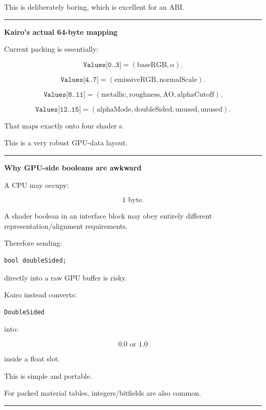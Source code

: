 This is deliberately boring, which is excellent for an ABI.

\begin{center}\rule{0.5\linewidth}{0.5pt}\end{center}

\textbf{Kairo's actual 64-byte mapping}

Current packing is essentially:

\[
\texttt{Values[0..3]}
=
(\text{baseRGB},\alpha).
\]

\[
\texttt{Values[4..7]}
=
(\text{emissiveRGB},\text{normalScale}).
\]

\[
\texttt{Values[8..11]}
=
(\text{metallic},
\text{roughness},
\text{AO},
\text{alphaCutoff}).
\]

\[
\texttt{Values[12..15]}
=
(\text{alphaMode},
\text{doubleSided},
\text{unused},\text{unused}).
\]

That maps exactly onto four shader s.

This is a very robust GPU-data layout.

\begin{center}\rule{0.5\linewidth}{0.5pt}\end{center}

\textbf{Why GPU-side booleans are awkward}

A CPU  may occupy:

\[
1\text{ byte}.
\]

A shader boolean in an interface block may obey entirely different representation/alignment requirements.

Therefore sending:

\begin{verbatim}
bool doubleSided;
\end{verbatim}

directly into a raw GPU buffer is risky.

Kairo instead converts:

\begin{verbatim}
DoubleSided
\end{verbatim}

into:

\[
0.0\text{ or }1.0
\]

inside a float slot.

This is simple and portable.

For packed material tables, integers/bitfields are also common.

\begin{center}\rule{0.5\linewidth}{0.5pt}\end{center}

